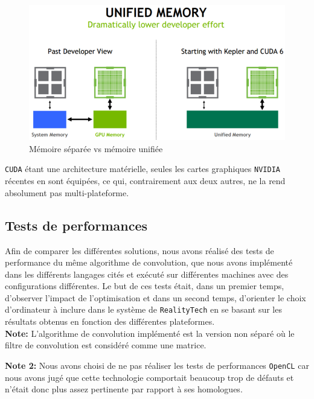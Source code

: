 \begin{figure}[H]
\centering
\includegraphics[width=0.65\linewidth]{images/cuda-unified-memory}
\caption{Mémoire séparée vs mémoire unifiée\protect\footnotemark}
\label{fig:cuda:unifiedmemory}
\end{figure}

\texttt{CUDA} étant une architecture matérielle, seules les cartes graphiques \texttt{NVIDIA} récentes en sont équipées, ce qui, contrairement aux deux autres, ne la rend absolument pas multi-plateforme.

\subsection{Tests de performances}
\label{sub:conv:bench}
Afin de comparer les différentes solutions, nous avons réalisé des tests de performance du même algorithme de convolution, que nous avons implémenté dans les différents langages cités et exécuté sur différentes machines avec des configurations différentes. Le but de ces tests était, dans un premier temps, d'observer l'impact de l'optimisation et dans un second temps, d'orienter le choix d'ordinateur à inclure dans le système de \texttt{RealityTech} en se basant sur les résultats obtenus en fonction des différentes plateformes.\\

\textbf{Note:} L'algorithme de convolution implémenté est la version non séparé où le filtre de convolution est considéré comme une matrice.

\textbf{Note 2:} Nous avons choisi de ne pas réaliser les tests de performances \texttt{OpenCL} car nous avons jugé que cette technologie comportait beaucoup trop de défauts et n'était donc plus assez pertinente par rapport à ses homologues.\\

